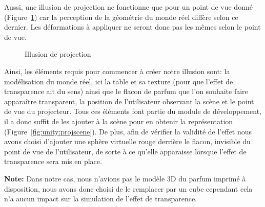 Aussi, une illusion de projection ne fonctionne que pour un point de vue donné (Figure~\ref{fig:projpov}) car la perception de la géométrie du monde réel diffère selon ce dernier. Les déformations à appliquer ne seront donc pas les mêmes selon le point de vue.

\begin{figure}[H]
\centering
\caption{Illusion de projection}
\label{fig:projpov}
\end{figure}

Ainsi, les éléments requis pour commencer à créer notre illusion sont: la modélisation du monde réel, ici la table et sa texture (pour que l'effet de transparence ait du sens) ainsi que le flacon de parfum que l'on souhaite faire apparaître transparent, la position de l'utilisateur observant la scène et le point de vue du projecteur. Tous ces éléments font partie du module de développement, il a donc suffit de les ajouter à la scène pour en obtenir la représentation (Figure~\ref{fig:unity:projscene}).
De plus, afin de vérifier la validité de l'effet nous avons choisi d'ajouter une sphère virtuelle rouge derrière le flacon, invisible du point de vue de l'utilisateur, de sorte à ce qu'elle apparaisse lorsque l'effet de transparence sera mis en place.

\textbf{Note:} Dans notre cas, nous n'avions pas le modèle 3D du parfum imprimé à disposition, nous avons donc choisi de le remplacer par un cube cependant cela n'a aucun impact sur la simulation de l'effet de transparence.

